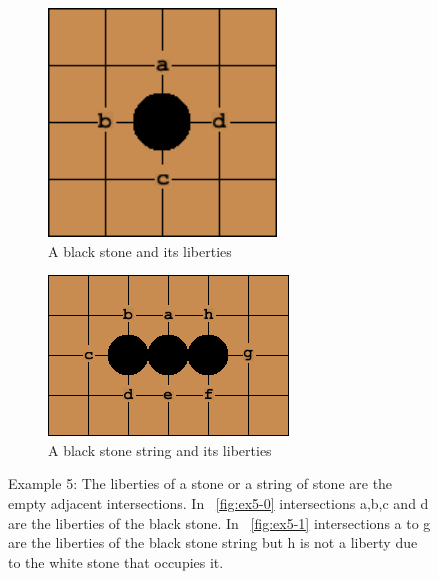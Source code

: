 \documentclass{l4proj}
\begin{document}
\begin{figure}[!ht]
\centering
\begin{subfigure}[b]{0.45\textwidth}
\centering
\includegraphics[width=0.666\textwidth]{ex/Ex5-0.png}
\caption{A black stone and its liberties}
\label{fig:ex5-0}
\end{subfigure}
\begin{subfigure}[b]{0.45\textwidth}
\centering
\includegraphics[width=\textwidth]{ex/Ex5-1.png}
\caption{A black stone string and its liberties}
\label{fig:ex5-1}
\end{subfigure}
\caption{Example 5: The liberties of a stone or a string of stone are the empty adjacent intersections.  In ~\autoref{fig:ex5-0} intersections a,b,c and d are the liberties of the black stone.
In ~\autoref{fig:ex5-1} intersections a to g are the liberties of the black stone string but h is not a liberty due to the white stone that occupies it.}
\label{fig:ex5}
\end{figure}
\end{document}
